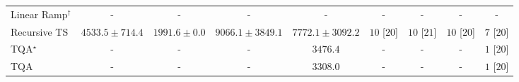 \begin{tabular}{l|cccc|cccc|}
Linear Ramp$^\dagger$ & {\cellcolor[HTML]{000000}} \color[HTML]{F1F1F1} {\cellcolor{white}} \color{black} - & {\cellcolor[HTML]{000000}} \color[HTML]{F1F1F1} {\cellcolor{white}} \color{black} - & {\cellcolor[HTML]{000000}} \color[HTML]{F1F1F1} {\cellcolor{white}} \color{black} - & {\cellcolor[HTML]{000000}} \color[HTML]{F1F1F1} {\cellcolor{white}} \color{black} - & {\cellcolor[HTML]{000000}} \color[HTML]{F1F1F1} {\cellcolor{white}} \color{black} - & {\cellcolor[HTML]{000000}} \color[HTML]{F1F1F1} {\cellcolor{white}} \color{black} - & {\cellcolor[HTML]{000000}} \color[HTML]{F1F1F1} {\cellcolor{white}} \color{black} - & {\cellcolor[HTML]{000000}} \color[HTML]{F1F1F1} {\cellcolor{white}} \color{black} - \\
Recursive TS & {\cellcolor[HTML]{9FBAD9}} \color[HTML]{000000} $4533.5\pm 714.4$ & {\cellcolor[HTML]{F5EEF6}} \color[HTML]{000000} $1991.6\pm 0.0$ & {\cellcolor[HTML]{023F64}} \color[HTML]{F1F1F1} $9066.1\pm 3849.1$ & {\cellcolor[HTML]{0566A0}} \color[HTML]{F1F1F1} $7772.1\pm 3092.2$ & {\cellcolor[HTML]{49006A}} \color[HTML]{F1F1F1} $10$ [$20$] & {\cellcolor[HTML]{49006A}} \color[HTML]{F1F1F1} $10$ [$21$] & {\cellcolor[HTML]{49006A}} \color[HTML]{F1F1F1} $10$ [$20$] & {\cellcolor[HTML]{CD238F}} \color[HTML]{F1F1F1} $7$ [$20$] \\
TQA$^\star$ & {\cellcolor[HTML]{000000}} \color[HTML]{F1F1F1} {\cellcolor{white}} \color{black} - & {\cellcolor[HTML]{000000}} \color[HTML]{F1F1F1} {\cellcolor{white}} \color{black} - & {\cellcolor[HTML]{000000}} \color[HTML]{F1F1F1} {\cellcolor{white}} \color{black} - & {\cellcolor[HTML]{CDD0E5}} \color[HTML]{000000} $3476.4$ & {\cellcolor[HTML]{000000}} \color[HTML]{F1F1F1} {\cellcolor{white}} \color{black} - & {\cellcolor[HTML]{000000}} \color[HTML]{F1F1F1} {\cellcolor{white}} \color{black} - & {\cellcolor[HTML]{000000}} \color[HTML]{F1F1F1} {\cellcolor{white}} \color{black} - & {\cellcolor[HTML]{FFF7F3}} \color[HTML]{000000} $1$ [$20$] \\
TQA & {\cellcolor[HTML]{000000}} \color[HTML]{F1F1F1} {\cellcolor{white}} \color{black} - & {\cellcolor[HTML]{000000}} \color[HTML]{F1F1F1} {\cellcolor{white}} \color{black} - & {\cellcolor[HTML]{000000}} \color[HTML]{F1F1F1} {\cellcolor{white}} \color{black} - & {\cellcolor[HTML]{D3D4E7}} \color[HTML]{000000} $3308.0$ & {\cellcolor[HTML]{000000}} \color[HTML]{F1F1F1} {\cellcolor{white}} \color{black} - & {\cellcolor[HTML]{000000}} \color[HTML]{F1F1F1} {\cellcolor{white}} \color{black} - & {\cellcolor[HTML]{000000}} \color[HTML]{F1F1F1} {\cellcolor{white}} \color{black} - & {\cellcolor[HTML]{FFF7F3}} \color[HTML]{000000} $1$ [$20$] \\
\cline{1-9}
\bottomrule
\end{tabular}
